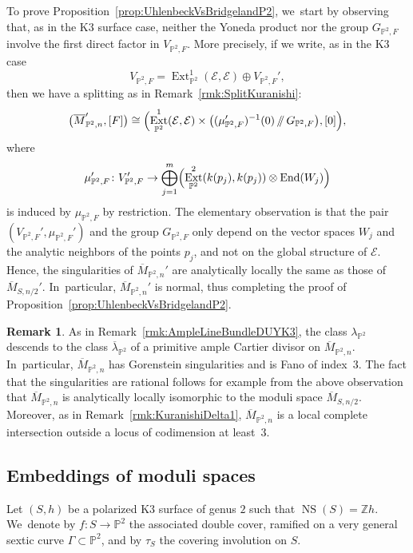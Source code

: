 \documentclass[JEP,XML,SOM,Unicode,published]{cedram}
\providecommand\sslash{\mathop{/\mkern-5.5mu/}}
\newcommand{\PP}{{\mathbb P}}\let\P\PP
\newcommand{\ZZ}{{\mathbb Z}}\let\Z\ZZ
\newcommand\cE{\mathcal{E}}
\DeclareMathOperator{\End}{End}
\DeclareMathOperator{\Ext}{Ext}
\DeclareMathOperator{\NS}{NS}
\theoremstyle{definition}
\newtheorem{rema}[lemm]{Remark}
\begin{document}
To prove Proposition~\ref{prop:UhlenbeckVsBridgelandP2}, we~start by observing that, as in the K3 surface case, neither the Yoneda product nor the group $G_{\P^2,F}$ involve the first direct factor in $V_{\PP^2,F}$.
More precisely, if we write, as in the K3 case
\[
V_{\PP^2,F} = \Ext^1_{\PP^2}(\cE,\cE) \oplus V_{\PP^2,F}',
\]
then we have a splitting as in Remark~\ref{rmk:SplitKuranishi}:
\begin{equation*}\label{eq:SplittingP2}
\bigl(\overline{M}_{\PP^2,n}',[F]\bigr)\cong \Bigl(\Ext^1_{\PP^2}(\cE,\cE) \times \bigl((\mu_{\PP^2,F}')^{-1}(0)\sslash G_{\P^2,F}\bigr),[0]\Bigr),
\end{equation*}
where
\[
\mu_{\PP^2,F}'\colon V_{\PP^2,F}'\to \bigoplus_{j=1}^m \Bigl(\Ext^2_{\PP^2}(k(p_j),k(p_j))\otimes \End(W_j) \Bigr)
\]
is induced by $\mu_{\PP^2,F}$ by restriction.
The elementary observation is that the pair $(V_{\PP^2,F}',\mu_{\PP^2,F}')$ and the group $G_{\P^2,F}$ only depend on the vector spaces $W_j$ and the analytic neighbors of the points $p_j$, and not on the global structure of $\cE$.
Hence, the singularities of $\overline{M}_{\PP^2,n}'$ are analytically locally the same as those of $\overline{M}_{S,n/2}'$. In~particular, $\overline{M}_{\PP^2,n}'$ is normal, thus completing the proof of Proposition~\ref{prop:UhlenbeckVsBridgelandP2}.

\begin{rema}\label{rmk:AmpleLineBundleDUYP2}
As in Remark~\ref{rmk:AmpleLineBundleDUYK3}, the class $\lambda_{\PP^2}$ descends to the class $\overline{\lambda}{}_{\PP^2}$ of a primitive ample Cartier divisor on $\overline{M}_{\PP^2,n}$. In~particular, $\overline{M}_{\PP^2,n}$ has Gorenstein singularities and is Fano of index~3.
The fact that the singularities are rational follows for example from the above observation that $\overline{M}_{\PP^2,n}$ is analytically locally isomorphic to the moduli space $\overline{M}_{S,n/2}$.
Moreover, as in Remark~\ref{rmk:KuranishiDelta1}, $\overline{M}_{\PP^2,n}$ is a local complete intersection outside a locus of codimension at least~3. \end{rema}

\subsection{Embeddings of moduli spaces}\label{subsec:EmbeddingsModuliSpaces}

Let $(S,h)$ be a polarized K3 surface of genus $2$ such that $\NS(S)=\ZZ h$. We~denote by $f\colon S \to \P^2$ the associated double cover, ramified on a very general sextic curve $\mathsf{\Gamma}\subset \PP^2$, and by $\tau_S$ the covering involution on $S$.
\end{document}
